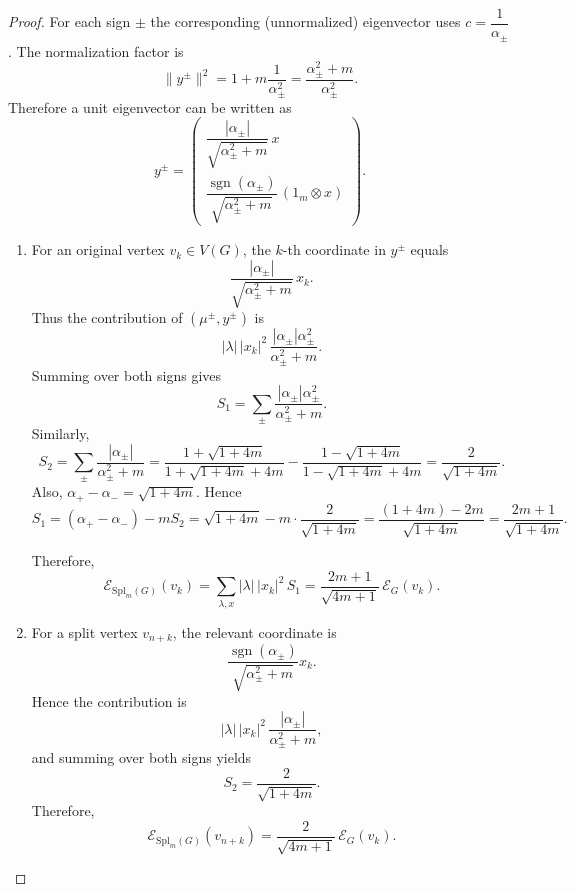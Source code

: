 \documentclass[10pt,a4paper]{amsart}
\begin{document}
\begin{proof}
	For each sign $\pm$ the corresponding (unnormalized) eigenvector uses $c=\dfrac{1}{\alpha_\pm}$. The normalization factor is
	$$\|y^\pm\|^2=1+m\frac{1}{\alpha_\pm^2}=\frac{\alpha_\pm^2+m}{\alpha_\pm^2}.$$
	Therefore a unit eigenvector can be written as
	$$y^\pm=\begin{pmatrix}
		\dfrac{|\alpha_\pm|}{\sqrt{\alpha_\pm^2+m}}\, x \\[6pt]
		\dfrac{\operatorname{sgn}(\alpha_\pm)}{\sqrt{\alpha_\pm^2+m}}\,(1_m\otimes x)
	\end{pmatrix}.$$
	\begin{enumerate}
		\item 	For an original vertex $v_k\in V(G)$, the $k$-th coordinate in $y^\pm$ equals $$\dfrac{|\alpha_\pm|}{\sqrt{\alpha_\pm^2+m}}\,x_k.$$ Thus the contribution of $(\mu^\pm,y^\pm)$ is
		$$|\lambda|\,|x_k|^2\, \frac{|\alpha_\pm|\alpha_\pm^2}{\alpha_\pm^2+m}.$$
		Summing over both signs gives
		$$S_1=\sum_{\pm}\frac{|\alpha_\pm|\alpha_\pm^2}{\alpha_\pm^2+m}.$$
		Similarly,
		$$S_2=\sum_{\pm}\frac{|\alpha_\pm|}{\alpha_\pm^2+m}
		=\frac{1+\sqrt{1+4m}}{1+\sqrt{1+4m}+4m}
		-\frac{1-\sqrt{1+4m}}{1-\sqrt{1+4m}+4m}
		=\frac{2}{\sqrt{1+4m}}.$$
		Also,
		$\alpha_+-\alpha_-=\sqrt{1+4m}.$
		Hence
		$$S_1=(\alpha_+-\alpha_-)-mS_2
		=\sqrt{1+4m}-m\cdot\frac{2}{\sqrt{1+4m}}
		=\frac{(1+4m)-2m}{\sqrt{1+4m}}
		=\frac{2m+1}{\sqrt{1+4m}}.$$
		
		Therefore,
		$$\mathcal{E}_{\mathrm{Spl}_m(G)}(v_k)
		=\sum_{\lambda,x}|\lambda|\,|x_k|^2\,S_1
		=\frac{2m+1}{\sqrt{4m+1}}\,\mathcal{E}_G(v_k).$$
		\item  	For a split vertex $v_{n+k}$, the relevant coordinate is $$\dfrac{\operatorname{sgn}(\alpha_\pm)}{\sqrt{\alpha_\pm^2+m}}x_k.$$ Hence the contribution is
		$$|\lambda|\,|x_k|^2\,\frac{|\alpha_\pm|}{\alpha_\pm^2+m},$$
		and summing over both signs yields $$S_2=\dfrac{2}{\sqrt{1+4m}}.$$ Therefore,
		$$\mathcal{E}_{\mathrm{Spl}_m(G)}(v_{n+k})
		=\frac{2}{\sqrt{4m+1}}\,\mathcal{E}_G(v_k).$$
		
	\end{enumerate}
	
\end{proof}
\end{document}
